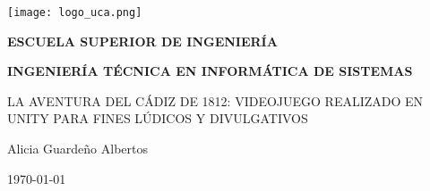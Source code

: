

\begin{titlepage}

  \begin{center}

    \texttt{[image: logo\_uca.png]} \\
    
    \vspace{2.0cm}
    
    \LARGE{\textbf{ESCUELA SUPERIOR DE INGENIERÍA}} \\
    
    \vspace{1.0cm}
    
    \Large{\textbf{INGENIERÍA TÉCNICA EN INFORMÁTICA DE SISTEMAS}} \\
    
    \vspace{3.0cm}
    
    \Large{LA AVENTURA DEL CÁDIZ DE 1812: VIDEOJUEGO REALIZADO EN UNITY PARA FINES LÚDICOS Y DIVULGATIVOS} \\
    
    \vspace{2.0cm}
    
    \Large{Alicia Guardeño Albertos} \\
  
    \vspace{0.5cm}

    \large{\today}
    
  \end{center}
\end{titlepage}
